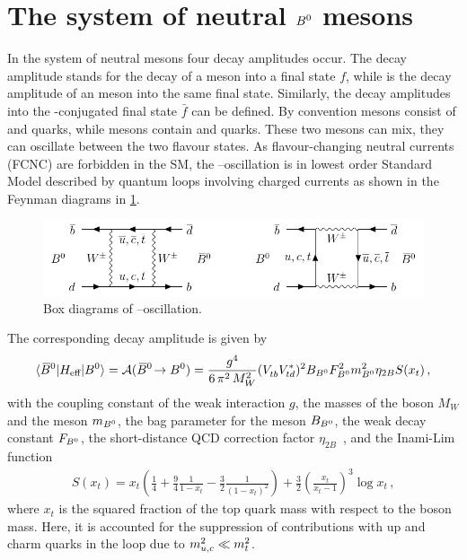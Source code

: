 
\section{The system of neutral \texorpdfstring{${{B}^0}$}{B0} mesons}
\label{sec:cpviolation:neutralBmesons}

In the system of neutral \Bd mesons four decay amplitudes occur. The decay
amplitude \Af stands for the decay of a \Bd meson into a final state $f$, while
\Abarf is the decay amplitude of an \Bdb meson into the same final state.
Similarly, the decay amplitudes into the \CP-conjugated final state $\bar{f}$
can be defined. By convention \Bd mesons consist of \bquarkbar and \dquark
quarks, while \Bdb mesons contain \bquark and \dquarkbar quarks. These two
mesons can mix, \ie they can oscillate between the two flavour states. As
flavour-changing neutral currents (FCNC) are forbidden in the SM, the
\Bd--\Bdb oscillation is in lowest order Standard Model described by quantum
loops involving charged currents as shown in the Feynman diagrams in
\cref{fig:cpviolation:neutralBmesons:boxdiagram}.
\begin{figure}[htb]
\centering
\includegraphics[width=\textwidth]{03-CPViolation/tikz/pdf/Boxdiagrams.pdf}
\caption{Box diagrams of \Bd--\Bdb oscillation.}
\label{fig:cpviolation:neutralBmesons:boxdiagram}
\end{figure}
The corresponding decay amplitude is given by
\begin{align}
	\langle {\ensuremath{{\kern 0.18em\overline{\kern -0.18em B}{}}{}^0}}|H_{\textrm{eff}}|{{B}^0}\rangle = \mathcal{A}({{\kern 0.18em\overline{\kern -0.18em B}{}}{}^0}\!\rightarrow{\ensuremath{{B}^0}}) = \frac{g^4}{6\,\pi^2\,M_W^2}({V_{{t}{b}}^{}}{V_{{t}{d}}^\ast})^2 B_{{{B}^0}} F_{{{B}^0}}^2 m_{{{B}^0}}^2 \eta_{2B} S(x_t)\,,
\label{eq:cpviolation:mixingamplitude}
\end{align}
with the coupling constant of the weak interaction $g$, the masses of the \W
boson $M_W$ and the \Bd meson $m_{{{B}^0}}$, the bag parameter for the \Bd meson
$B_{{{B}^0}}$, the weak decay constant $F_{{{B}^0}}$, the short-distance QCD
correction factor $\eta_{2B}$~\cite{Buchalla:1995vs}, and the Inami-Lim
function~\cite{Inami:1980fz}
\begin{align}
	S(x_t) = x_t \left(\frac 14 + \frac 94 \frac{1}{1 - x_t} - \frac 32 \frac{1}{(1 - x_t)^2}\right) + \frac 32 \left(\frac{x_t}{x_t - 1}\right)^3 \log x_t\,,
\label{eq:cpviolation:inamilim}
\end{align}
where $x_t$ is the squared fraction of the top quark mass with respect to the
\W boson mass. Here, it is accounted for the suppression of contributions with
up and charm quarks in the loop due to $m_{{u},{c}}^2 \ll
m_{{t}}^2$.

